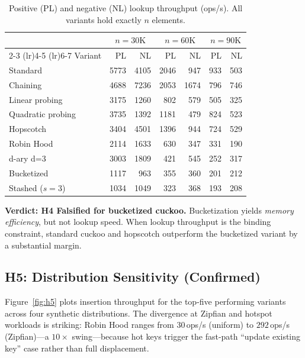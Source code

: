 \documentclass[10pt,journal,compsoc]{IEEEtran}
\begin{document}
\begin{table}[h]
\centering
\caption{Positive (PL) and negative (NL) lookup throughput (ops/s). All variants hold exactly $n$ elements.}
\label{tab:h4full}
\small
\begin{tabular}{@{}lrrrrrr@{}}
\toprule
 & \multicolumn{2}{c}{$n=30\mathrm{K}$} & \multicolumn{2}{c}{$n=60\mathrm{K}$} & \multicolumn{2}{c}{$n=90\mathrm{K}$} \\
\cmidrule(lr){2-3} \cmidrule(lr){4-5} \cmidrule(lr){6-7}
Variant            & PL    & NL    & PL    & NL   & PL   & NL  \\
\midrule
Standard           & 5773  & 4105  & 2046  & 947  & 933  & 503 \\
Chaining           & 4688  & 7236  & 2053  & 1674 & 796  & 746 \\
Linear probing     & 3175  & 1260  & 802   & 579  & 505  & 325 \\
Quadratic probing  & 3735  & 1392  & 1181  & 479  & 824  & 523 \\
Hopscotch          & 3404  & 4501  & 1396  & 944  & 724  & 529 \\
Robin Hood         & 2114  & 1633  & 630   & 347  & 331  & 190 \\
d-ary d=3  & 3003  & 1809  & 421   & 545  & 252  & 317 \\
Bucketized         & 1117  & 963   & 355   & 360  & 201  & 212 \\
Stashed ($s{=}3$)  & 1034  & 1049  & 323   & 368  & 193  & 208 \\
\bottomrule
\end{tabular}
\end{table}

\textbf{Verdict: H4 Falsified for bucketized cuckoo.} Bucketization yields \emph{memory efficiency}, but not lookup speed. When lookup throughput is the binding constraint, standard cuckoo and hopscotch outperform the bucketized variant by a substantial margin.

\subsection{H5: Distribution Sensitivity (Confirmed)}

Figure~\ref{fig:h5} plots insertion throughput for the top-five performing variants across four synthetic distributions. The divergence at Zipfian and hotspot workloads is striking: Robin Hood ranges from $30$\,ops/s (uniform) to $292$\,ops/s (Zipfian)---a $10\times$ swing---because hot keys trigger the fast-path ``update existing key'' case rather than full displacement.
\end{document}
